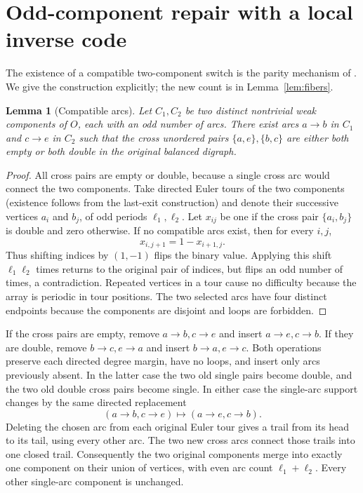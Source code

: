 \documentclass[11pt]{article}
\newtheorem{lemma}[theorem]{Lemma}
\theoremstyle{remark}\newtheorem{remark}[theorem]{Remark}
\begin{document}
\section{Odd-component repair with a local inverse code}\label{sec:repair}
The existence of a compatible two-component switch is the parity mechanism of \cite[Lemma 9.5]{mehrdad26}. We give the construction explicitly; the new count is in Lemma~\ref{lem:fibers}.
\begin{lemma}[Compatible arcs]\label{lem:compat}
Let $C_1,C_2$ be two distinct nontrivial weak components of $O$, each with an odd number of arcs. There exist arcs $a\to b$ in $C_1$ and $c\to e$ in $C_2$ such that the cross unordered pairs $\{a,e\},\{b,c\}$ are either both empty or both double in the original balanced digraph.
\end{lemma}
\begin{proof}
All cross pairs are empty or double, because a single cross arc would connect the two components. Take directed Euler tours of the two components (existence follows from the last-exit construction) and denote their successive vertices $a_i$ and $b_j$, of odd periods $\ell_1,\ell_2$. Let $x_{ij}$ be one if the cross pair $\{a_i,b_j\}$ is double and zero otherwise. If no compatible arcs exist, then for every $i,j$,
\[x_{i,j+1}=1-x_{i+1,j}.\]
Thus shifting indices by $(1,-1)$ flips the binary value. Applying this shift $\ell_1\ell_2$ times returns to the original pair of indices, but flips an odd number of times, a contradiction. Repeated vertices in a tour cause no difficulty because the array is periodic in tour positions. The two selected arcs have four distinct endpoints because the components are disjoint and loops are forbidden.
\end{proof}

If the cross pairs are empty, remove $a\to b,c\to e$ and insert $a\to e,c\to b$. If they are double, remove $b\to c,e\to a$ and insert $b\to a,e\to c$. Both operations preserve each directed degree margin, have no loops, and insert only arcs previously absent. In the latter case the two old single pairs become double, and the two old double cross pairs become single. In either case the single-arc support changes by the same directed replacement
\begin{equation}\label{eq:replace}
 (a\to b,c\to e)\longmapsto(a\to e,c\to b).
\end{equation}
Deleting the chosen arc from each original Euler tour gives a trail from its head to its tail, using every other arc. The two new cross arcs connect those trails into one closed trail. Consequently the two original components merge into exactly one component on their union of vertices, with even arc count $\ell_1+\ell_2$. Every other single-arc component is unchanged.
\end{document}
